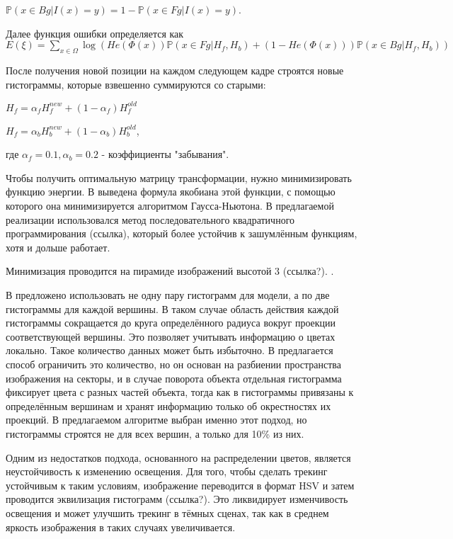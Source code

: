 $
    \mathbb{P}(x \in Bg | I(x) = y) = 1 - \mathbb{P}(x \in Fg | I(x) = y)
$.

Далее функция ошибки определяется как
$
    E(\xi) = \sum\limits_{x \in \Omega}\log(He(\Phi(x))\mathbb{P}(x \in Fg | H_f, H_b) + (1 - He(\Phi(x)))\mathbb{P}(x \in Bg|H_f, H_b))
$

После получения новой позиции на каждом следующем кадре строятся новые
гистограммы, которые взвешенно суммируются со старыми: 

$
    H_{f} = \alpha_f H_{f}^{new} + (1 - \alpha_f) H_f^{old}
$

$
    H_{f} = \alpha_b H_{b}^{new} + (1 - \alpha_b) H_b^{old}
$, 

где $\alpha_f = 0.1, \alpha_b = 0.2$ - коэффициенты "забывания".

Чтобы получить оптимальную матрицу трансформации, нужно минимизировать функцию
энергии.
В \cite{Tjaden2018} выведена формула якобиана этой функции, с помощью которого
она минимизируется алгоритмом Гаусса-Ньютона.
В предлагаемой реализации использовался метод последовательного квадратичного
программирования (ссылка), который более устойчив к зашумлённым функциям, хотя
и дольше работает. 

Минимизация проводится на пирамиде изображений высотой 3 (ссылка?).
.

В \cite{Tjaden2017} предложено использовать не одну пару гистограмм для модели,
а по две гистограммы для каждой вершины.
В таком случае область действия каждой гистограммы сокращается до круга
определённого радиуса вокруг проекции соответствующей вершины.
Это позволяет учитывать информацию о цветах локально.
Такое количество данных может быть избыточно.
В \cite{RegionPhotometric} предлагается способ ограничить это количество, но он
основан на разбиении пространства изображения на секторы, и  в случае поворота
объекта отдельная гистограмма фиксирует цвета с разных частей объекта, тогда
как в \cite{Tjaden2017} гистограммы привязаны к определённым вершинам и хранят
информацию только об окрестностях их проекций.
В предлагаемом алгоритме выбран именно этот подход, но гистограммы строятся не
для всех вершин, а только для 10\% из них.

Одним из недостатков подхода, основанного на распределении цветов, является
неустойчивость к изменению освещения.
Для того, чтобы сделать трекинг устойчивым к таким условиям, изображение
переводится в формат HSV и затем проводится эквилизация гистограмм (ссылка?).
Это ликвидирует изменчивость освещения и может улучшить трекинг в тёмных
сценах, так как в среднем яркость изображения в таких случаях увеличивается.
